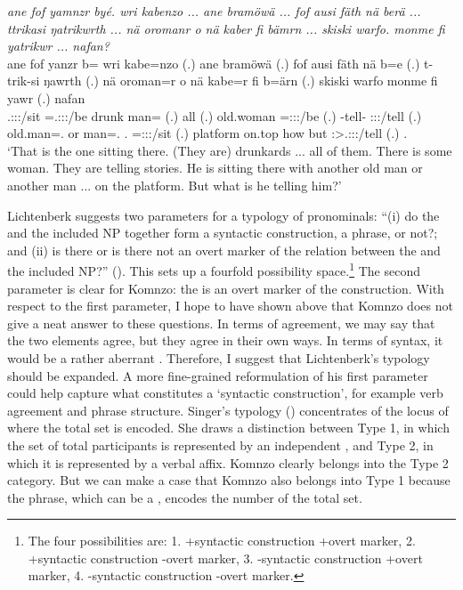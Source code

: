 \begin{exe}
	\ex \emph{ane fof yamnzr byé. wri kabenzo ... ane bramöwä ... fof ausi fäth nä berä ... ttrikasi ŋatrikwrth ... nä oromanr o nä kaber fi bämrn ... skiski warfo. monme fi yatrikwr ... nafan?}\\
	\gll ane fof yanzr b= wri kabe=nzo (.) ane bramöwä (.) fof ausi fäth nä b=e (.) t-trik-si ŋawrth (.) nä {oroman=r} o nä kabe=r fi b=ärn (.) skiski warfo monme fi yawr (.) nafan\\
	{\Dem} {\Emph} \Tsg.\Masc:\Sbj:\Nonpast:\Ipfv/sit \Med=\Tsg.\Masc:\Sbj:\Nonpast:\Ipfv/be drunk man={\Only} (.) {\Dem} all (.) {\Emph} old.woman \Dim{} {\Indf} \Med=\Stpl:\Sbj:\Nonpast:\Ipfv/be (.) \Redup-tell-{\Nmlz} \Stpl:\Sbj:\Nonpast:\Ipfv/tell (.) {\Indf} {old.man=\Assoc.\Du} or {\Indf} man=\Assoc.{\Du} \Third.{\Abs} \Med=\Stdu:\Sbj:\Nonpast:\Ipfv/sit (.) platform on.top how but \Stsg:\Sbj>\Tsg.\Masc:\Io:\Nonpast:\Ipfv/tell (.) \Tsg.\Dat\\
	\trans `That is the one sitting there. (They are) drunkards ... all of them. There is some woman. They are telling stories. He is sitting there with another old man or another man ... on the platform. But what is he telling him?'\\
	\label{ex743}
\end{exe}

Lichtenberk suggests two parameters for a typology of  pronominals: ``(i) do the   and the included NP together form a syntactic construction, a phrase, or not?; and (ii) is there or is there not an overt marker of the relation between the   and the included NP?'' (\citeyear[3]{Lichtenberk:2000hr}). This sets up a fourfold possibility space.\footnote{The four possibilities are: 1. +syntactic construction +overt marker, 2. +syntactic construction -overt marker, 3. -syntactic construction +overt marker, 4. -syntactic construction -overt marker.} The second parameter is clear for Komnzo: the   is an overt marker of the  construction. With respect to the first parameter, I hope to have shown above that Komnzo does not give a neat answer to these questions. In terms of agreement, we may say that the two elements agree, but they agree in their own ways. In terms of  syntax, it would be a rather aberrant . Therefore, I suggest that Lichtenberk's typology should be expanded. A more fine-grained reformulation of his first parameter could help capture what constitutes a `syntactic construction', for example verb agreement and phrase structure. Singer's typology (\citeyear{Singer:inclu}) concentrates of the locus of where the total set is encoded. She draws a distinction between Type 1, in which the set of total participants is represented by an independent , and Type 2, in which it is represented by a verbal affix. Komnzo clearly belongs into the Type 2 category. But we can make a case that Komnzo also belongs into Type 1 because the  phrase, which can be a , encodes the number of the total set.

